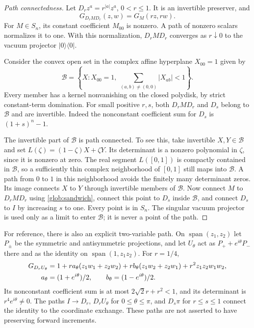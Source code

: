 \documentclass[reqno]{amsart}
\theoremstyle{definition}
\theoremstyle{remark}
\begin{document}
\begin{proof}[Path connectedness]
Let $D_rz^a=r^{|a|}z^a$, $0<r\leq1$.  It is an invertible preserver,
and
\begin{equation}\label{glob:sandwich}
 G_{D_rMD_r}(z,w)=G_M(rz,rw).
\end{equation}
For $M\in S_n$, its constant coefficient $M_{00}$ is nonzero.
A path of nonzero scalars normalizes it to one.  With this normalization,
$D_rMD_r$ converges as $r\downarrow0$ to the vacuum projector
$|0\rangle\langle0|$.

Consider the convex open set in the complex affine hyperplane $X_{00}=1$
given by
\begin{equation}\label{glob:coefficient-ball}
 \mathcal B=\left\{X:X_{00}=1,
        \ \sum_{(a,b)\ne(0,0)}|X_{ab}|<1\right\}.
\end{equation}
Every member has a kernel nonvanishing on the closed polydisk, by strict
constant-term domination.  For small positive $r,s$, both $D_rMD_r$
and $D_s$ belong to $\mathcal B$ and are invertible.  Indeed the
nonconstant coefficient sum for $D_s$ is $(1+s)^n-1$.

The invertible part of $\mathcal B$ is path connected.  To see this,
take invertible $X,Y\in\mathcal B$ and set
$L(\zeta)=(1-\zeta)X+\zeta Y$.  Its determinant is a nonzero
polynomial in $\zeta$, since it is nonzero at zero.  The real segment
$L([0,1])$ is compactly contained in $\mathcal B$, so a sufficiently
thin complex neighborhood of $[0,1]$ still maps into $\mathcal B$.
A path from $0$ to $1$ in this neighborhood avoids the finitely many
determinant zeros.  Its image connects $X$ to $Y$ through invertible
members of $\mathcal B$.
Now connect $M$ to $D_rMD_r$ using \eqref{glob:sandwich}, connect this
point to $D_s$ inside $\mathcal B$, and connect $D_s$ to $I$ by
increasing $s$ to one.  Every point is in $S_n$.  The singular vacuum
projector is used only as a limit to enter $\mathcal B$; it is never a
point of the path.
\end{proof}

For reference, there is also an explicit two-variable path.  On
$\operatorname{span}(z_1,z_2)$ let $P_\pm$ be the symmetric and
antisymmetric projections, and let $U_\theta$ act as
$P_++e^{i\theta}P_-$ there and as the identity on
$\operatorname{span}(1,z_1z_2)$.  For $r=1/4$,
\begin{align}\label{glob:swap-path}
 G_{D_rU_\theta}
 ={}&1+ra_\theta(z_1w_1+z_2w_2)
       +rb_\theta(z_1w_2+z_2w_1)
       +r^2z_1z_2w_1w_2,\notag\\
 a_\theta={}&(1+e^{i\theta})/2,\qquad
 b_\theta=(1-e^{i\theta})/2.
\end{align}
Its nonconstant coefficient sum is at most
$2\sqrt2r+r^2<1$, and its determinant is $r^4e^{i\theta}\ne0$.
The paths $I\to D_r$, $D_rU_\theta$ for $0\leq\theta\leq\pi$,
and $D_s\pi$ for $r\leq s\leq1$ connect the identity to the
coordinate exchange.  These paths are not asserted to have preserving
forward increments.
\end{document}

